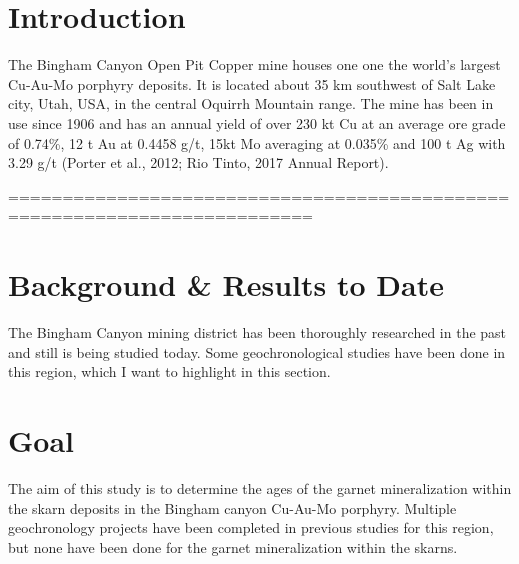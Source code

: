 \documentclass[a4paper,11pt,titlepage]{article}
\begin{document}
\section{Introduction}

The Bingham Canyon Open Pit Copper mine houses one one the world's largest Cu-Au-Mo porphyry deposits. It is located about 35 km southwest of Salt Lake city, Utah, USA, in the central Oquirrh Mountain range. The mine has been in use since 1906 and has an annual yield of over 230 kt Cu at an average ore grade of 0.74\%, 12 t Au at 0.4458 g/t, 15kt Mo averaging at 0.035\% and 100 t Ag with 3.29 g/t (Porter et al., 2012; Rio Tinto, 2017 Annual Report).

%
========================================================================== %

\vspace*{10pt}
\section{Background \& Results to Date}

The Bingham Canyon mining district has been thoroughly researched in the past and still is being studied today. Some geochronological studies have been done in this region, which I want to highlight in this section.





\vspace*{10pt}
\section{Goal}

The aim of this study is to determine the ages of the garnet mineralization within the skarn deposits in the Bingham canyon  Cu-Au-Mo porphyry. Multiple geochronology projects have been completed in previous studies for this region, but none have been done for the garnet mineralization within the skarns.
\end{document}
